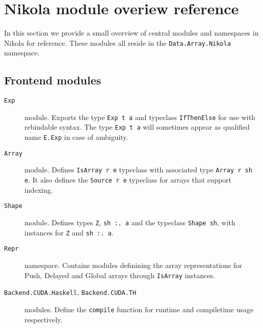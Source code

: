 \section{Nikola module overiew reference} \label{section:nikola-reference}

In this section we provide a small overview of central modules and namespaces
in Nikola for reference. These modules all reside in the
\texttt{Data.Array.Nikola} namespace.

\subsection{Frontend modules}
\begin{description}

  \item[\texttt{Exp}] module. Exports the type \texttt{Exp t a} and typeclass
    \texttt{IfThenElse} for use with rebindable syntax. The type \texttt{Exp t
    a} will sometimes appear as qualified name \texttt{E.Exp} in case of
    ambiguity.

  \item[\texttt{Array}] module. Defines \texttt{IsArray r e} typeclass with
    associated type \texttt{Array r sh e}. It also defines the
    \texttt{Source r e} typeclass for arrays that support indexing.

  \item[\texttt{Shape}] module. Defines types \texttt{Z}, \texttt{sh :. a}
    and the typeclass \texttt{Shape sh}, with instances for \texttt{Z} and
    \texttt{sh :. a}.

  \item[\texttt{Repr}] namespace. Contains modules definining the array
    representations for Push, Delayed and Global arrays through
    \texttt{IsArray} instances.

  \item[\texttt{Backend.CUDA.Haskell}, \texttt{Backend.CUDA.TH}] modules.
    Define the \texttt{compile} function for runtime and compiletime usage
    respectively.

\end{description}

